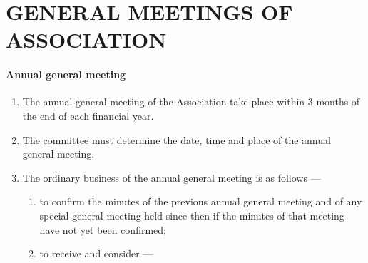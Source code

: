 \documentclass[../constitution.tex]{subfiles}
\begin{document}
\hypertarget{part-6-general-meetings-of-association}{%
\part{GENERAL MEETINGS OF ASSOCIATION}\label{part-6-general-meetings-of-association}}

\hypertarget{annual-general-meeting}{%
\subsection{Annual general meeting}\label{annual-general-meeting}}

\begin{enumerate}

\item The annual general meeting of the Association  take place within 3 months of the end of each financial year.


\item The committee must determine the date, time and place of the annual general meeting.
\item The ordinary business of the annual general meeting is as follows ---

  \begin{enumerate}
  
  \item to confirm the minutes of the previous annual general meeting and of any special general meeting held since then if the minutes of that meeting have not yet been confirmed;
  \item to receive and consider ---

    \begin{enumerate}
    

\end{enumerate}
\end{enumerate}
\end{enumerate}
\end{document}
